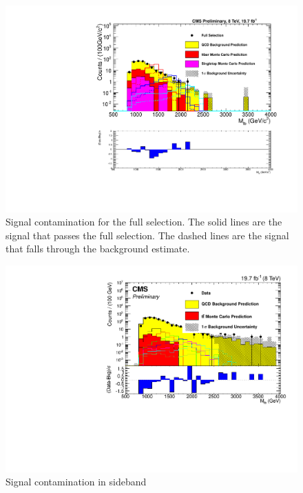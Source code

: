 \begin{figure}[Htcb]
\centering
\includegraphics[width=1.0\textwidth]{figs/sigcontsemilog.pdf}
\caption{Signal contamination for the full selection.  The solid lines are the signal that passes the full selection.  The dashed lines are the signal that falls through the background estimate.}
\label{figs:sigFS}
\end{figure}

\begin{figure}[Htcb]
\centering
\includegraphics[width=1.0\textwidth]{figs/NewMtbSB2semilogwithsignal.pdf}
\caption{Signal contamination in sideband}
\label{figs:sigSB2}
\end{figure}

